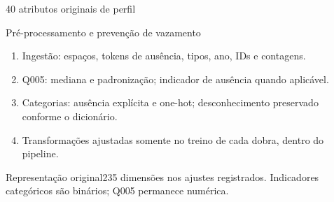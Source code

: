 \begin{frame}{40 atributos originais de perfil}
\end{frame}
\begin{frame}{Pré-processamento e prevenção de vazamento}
\begin{enumerate}\item Ingestão: espaços, tokens de ausência, tipos, ano, IDs e contagens.
\item Q005: mediana e padronização; indicador de ausência quando aplicável.
\item Categorias: ausência explícita e one-hot; desconhecimento preservado conforme o dicionário.
\item Transformações ajustadas somente no treino de cada dobra, dentro do pipeline.\end{enumerate}
\begin{block}{Representação original}235 dimensões nos ajustes registrados. Indicadores categóricos são binários; Q005 permanece numérica.\end{block}
\end{frame}
